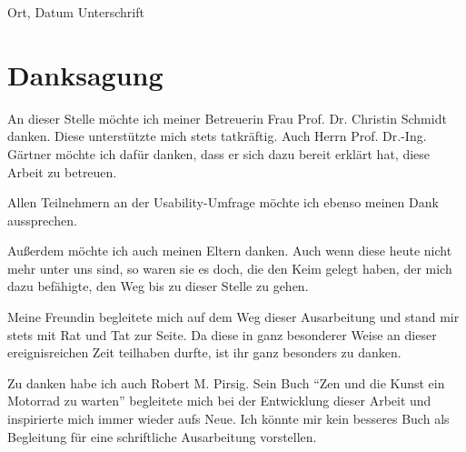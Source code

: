 \vspace{4cm}

\hspace{2cm} Ort, Datum \hfill Unterschrift \hspace{2cm}


\newpage

\section*{Danksagung}

An dieser Stelle möchte ich  meiner Betreuerin Frau Prof. Dr. Christin Schmidt danken. Diese unterstützte mich stets tatkräftig. Auch Herrn Prof. Dr.-Ing. Gärtner möchte ich dafür danken, dass er sich dazu bereit erklärt hat, diese Arbeit zu betreuen. 

Allen Teilnehmern an der Usability-Umfrage möchte ich ebenso meinen Dank aussprechen.

Außerdem möchte ich auch  meinen Eltern danken. Auch wenn diese heute nicht mehr unter uns sind, so waren sie es doch, die den Keim gelegt haben, der mich dazu befähigte, den Weg bis zu dieser Stelle zu gehen.

Meine Freundin begleitete mich auf dem Weg dieser Ausarbeitung und stand mir stets mit Rat und Tat zur Seite. Da diese in ganz besonderer Weise an dieser ereignisreichen Zeit teilhaben durfte, ist ihr ganz besonders zu danken.

Zu danken habe ich auch Robert M. Pirsig. Sein Buch "`Zen und die Kunst ein Motorrad zu warten"' begleitete mich bei der Entwicklung dieser Arbeit und inspirierte mich immer wieder aufs Neue. Ich könnte mir kein besseres Buch als Begleitung für eine schriftliche Ausarbeitung vorstellen.



